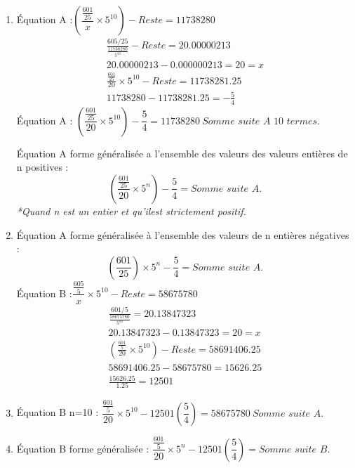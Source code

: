 \documentclass[11pt,a4paper]{article}
\begin{document}
\begin{enumerate}[label=\arabic*.,leftmargin=*,itemsep=6pt]
Pour équation A coefficient A : $\dfrac{11738280-2347655}{5^{8}}=\dfrac{601}{25}=\textit{Coefficient A.}$

Pour équation B coefficient B : $\dfrac{58675780-11722655}{5^{8}}=\dfrac{601}{5}=\textit{Coefficient B.}$
\item Équation A :$\left(\dfrac{\frac{601}{25}}{x}\times5^{10}\right)-\textit{Reste}=11738280$
\begin{gather*}
\frac{605/25}{\frac{11738280}{5^{10}}}-\textit{Reste}=20.00000213\\
20.00000213-0.000000213=20=x\\
\frac{\frac{601}{25}}{20}\times5^{10}-\textit{Reste}=11738281.25\\
11738280-11738281.25=-\frac{5}{4}
\end{gather*}
Équation A : $\left(\dfrac{\frac{601}{25}}{20}\times5^{10}\right)-\dfrac{5}{4}=11738280\ \textit{Somme suite A 10 termes.}$

Équation A forme généralisée a l’ensemble des valeurs des valeurs entières de n positives :
\[
\left(\frac{\frac{601}{25}}{20}\times5^{n}\right)-\frac{5}{4}=\textit{Somme suite A.}
\]
\textit{*Quand n est un entier et qu'ilest strictement positif.}
\item Équation A forme généralisée à l’ensemble des valeurs de n entières négatives :
\[
\left(\frac{601}{25}\right)\times5^{n}-\frac{5}{4}=\textit{Somme suite A.}
\]
Équation B :$\dfrac{\frac{605}{5}}{x}\times5^{10}-\textit{Reste}=58675780$
\begin{gather*}
\frac{601/5}{\frac{58675780}{5^{10}}}=20.13847323\\
20.13847323-0.13847323=20=x\\
\left(\frac{\frac{601}{5}}{20}\times5^{10}\right)-\textit{Reste}=58691406.25\\
58691406.25-58675780=15626.25\\
\frac{15626.25}{1.25}=12501
\end{gather*}
\item Équation B n=10 : $\dfrac{\frac{601}{5}}{20}\times5^{10}-12501\left(\dfrac{5}{4}\right)=58675780\ \textit{Somme suite A.}$
\item Équation B forme généralisée : $\dfrac{\frac{601}{5}}{20}\times5^{n}-12501\left(\dfrac{5}{4}\right)=\textit{Somme suite B.}$
\end{enumerate}
\end{document}
